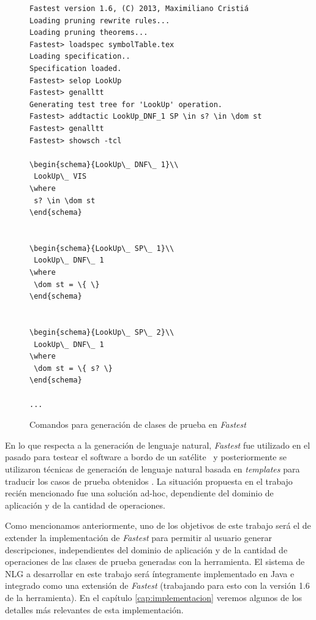 \begin{figure}[H]
\begin{Verbatim}[frame=single,fontsize=\scriptsize]
Fastest version 1.6, (C) 2013, Maximiliano Cristiá
Loading pruning rewrite rules...
Loading pruning theorems...
Fastest> loadspec symbolTable.tex
Loading specification..
Specification loaded.
Fastest> selop LookUp
Fastest> genalltt 
Generating test tree for 'LookUp' operation.
Fastest> addtactic LookUp_DNF_1 SP \in s? \in \dom st
Fastest> genalltt                                    
Fastest> showsch -tcl

\begin{schema}{LookUp\_ DNF\_ 1}\\
 LookUp\_ VIS 
\where
 s? \in \dom st
\end{schema}


\begin{schema}{LookUp\_ SP\_ 1}\\
 LookUp\_ DNF\_ 1 
\where
 \dom st = \{ \}
\end{schema}


\begin{schema}{LookUp\_ SP\_ 2}\\
 LookUp\_ DNF\_ 1 
\where
 \dom st = \{ s? \}
\end{schema}

...
\end{Verbatim}
\caption{Comandos para generación de clases de prueba en \emph{Fastest}}
\label{ej:comandos_fastest}
\end{figure}


En lo que respecta a la generación de lenguaje natural, \emph{Fastest} fue utilizado en el pasado para testear el software a bordo de un satélite~\cite{satelite} y posteriormente se utilizaron técnicas de generación de lenguaje natural basada en \textit{templates} para traducir los casos de prueba obtenidos \cite{cristia_pluss}. La situación propuesta en el trabajo recién mencionado fue una solución ad-hoc, dependiente del dominio de aplicación y de la cantidad de operaciones.


Como mencionamos anteriormente, uno de los objetivos de este trabajo será el de extender la implementación de \emph{Fastest} para permitir al usuario generar descripciones, independientes del dominio de aplicación y de la cantidad de operaciones de las clases de prueba generadas con la herramienta.
El sistema de NLG a desarrollar en este trabajo será íntegramente implementado en Java e integrado como una extensión de \emph{Fastest} (trabajando para esto con la versión 1.6 de la herramienta). En el capítulo \ref{cap:implementacion} veremos algunos de los detalles más relevantes de esta implementación.

